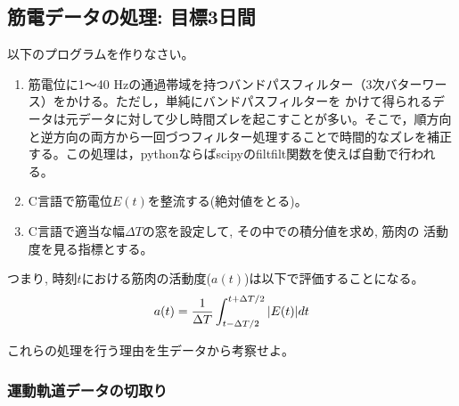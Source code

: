 \documentclass{jsarticle}
\begin{document}
\subsection{筋電データの処理: 目標3日間}
以下のプログラムを作りなさい。
\begin{enumerate}
\item 筋電位に1〜40 Hzの通過帯域を持つバンドパスフィルター（3次バターワース）をかける。ただし，単純にバンドパスフィルターを
かけて得られるデータは元データに対して少し時間ズレを起こすことが多い。そこで，順方向と逆方向の両方から一回づつフィルター処理することで時間的なズレを補正する。この処理は，pythonならばscipyのfiltfilt関数を使えば自動で行われる。
\item C言語で筋電位$E(t)$を整流する(絶対値をとる)。
\item C言語で適当な幅$\Delta T$の窓を設定して, その中での積分値を求め, 筋肉の
  活動度を見る指標とする。
\end{enumerate}
つまり, 時刻$t$における筋肉の活動度($a(t)$)は以下で評価することになる。
\begin{align}
  a(t)=\frac{1}{\Delta T}\int_{t-\Delta T/2}^{t+\Delta T/2}|E(t)|dt\notag
\end{align}

これらの処理を行う理由を生データから考察せよ。

\subsubsection{運動軌道データの切取り}
\end{document}
